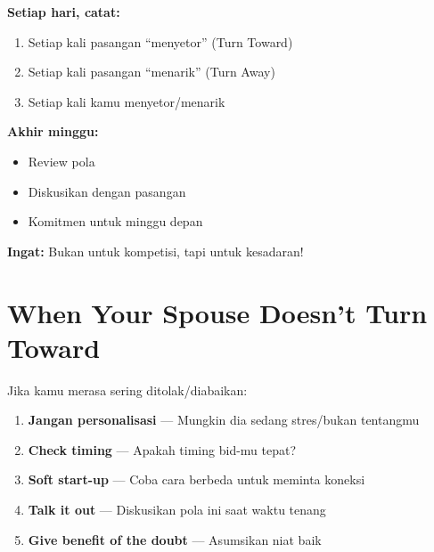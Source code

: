 \begin{exercisebox}
\textbf{Setiap hari, catat:}
\begin{enumerate}
    \item Setiap kali pasangan ``menyetor'' (Turn Toward)
    \item Setiap kali pasangan ``menarik'' (Turn Away)
    \item Setiap kali kamu menyetor/menarik
\end{enumerate}

\textbf{Akhir minggu:}
\begin{itemize}
    \item Review pola
    \item Diskusikan dengan pasangan
    \item Komitmen untuk minggu depan
\end{itemize}

\textbf{Ingat:} Bukan untuk kompetisi, tapi untuk kesadaran!
\end{exercisebox}

\section{When Your Spouse Doesn't Turn Toward}

Jika kamu merasa sering ditolak/diabaikan:

\begin{enumerate}
    \item \textbf{Jangan personalisasi} --- Mungkin dia sedang stres/bukan tentangmu
    \item \textbf{Check timing} --- Apakah timing bid-mu tepat?
    \item \textbf{Soft start-up} --- Coba cara berbeda untuk meminta koneksi
    \item \textbf{Talk it out} --- Diskusikan pola ini saat waktu tenang
    \item \textbf{Give benefit of the doubt} --- Asumsikan niat baik
\end{enumerate}

